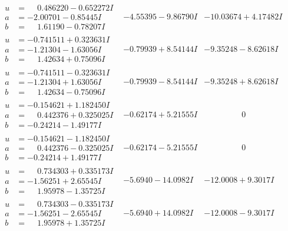\documentclass[1p]{elsarticle_modified}
\theoremstyle{definition}
\begin{document}
$$\begin{array}{c|c|c}
\begin{aligned}
u &= \phantom{-}0.486220 - 0.652272 I \\
a &= -2.00701 - 0.85445 I \\
b &= \phantom{-}1.61190 - 0.78207 I\end{aligned}
 & -4.55395 - 9.86790 I & -10.03674 + 4.17482 I \\ \hline\begin{aligned}
u &= -0.741511 + 0.323631 I \\
a &= -1.21304 - 1.63056 I \\
b &= \phantom{-}1.42634 + 0.75096 I\end{aligned}
 & -0.79939 + 8.54144 I & -9.35248 - 8.62618 I \\ \hline\begin{aligned}
u &= -0.741511 - 0.323631 I \\
a &= -1.21304 + 1.63056 I \\
b &= \phantom{-}1.42634 - 0.75096 I\end{aligned}
 & -0.79939 - 8.54144 I & -9.35248 + 8.62618 I \\ \hline\begin{aligned}
u &= -0.154621 + 1.182450 I \\
a &= \phantom{-}0.442376 + 0.325025 I \\
b &= -0.24214 - 1.49177 I\end{aligned}
 & -0.62174 + 5.21555 I & \phantom{-0.000000 } 0 \\ \hline\begin{aligned}
u &= -0.154621 - 1.182450 I \\
a &= \phantom{-}0.442376 - 0.325025 I \\
b &= -0.24214 + 1.49177 I\end{aligned}
 & -0.62174 - 5.21555 I & \phantom{-0.000000 } 0 \\ \hline\begin{aligned}
u &= \phantom{-}0.734303 + 0.335173 I \\
a &= -1.56251 + 2.65545 I \\
b &= \phantom{-}1.95978 - 1.35725 I\end{aligned}
 & -5.6940 - 14.0982 I & -12.0008 + 9.3017 I \\ \hline\begin{aligned}
u &= \phantom{-}0.734303 - 0.335173 I \\
a &= -1.56251 - 2.65545 I \\
b &= \phantom{-}1.95978 + 1.35725 I\end{aligned}
 & -5.6940 + 14.0982 I & -12.0008 - 9.3017 I \\ \hline\begin{aligned}

\end{aligned}
\end{array}$$
\end{document}

